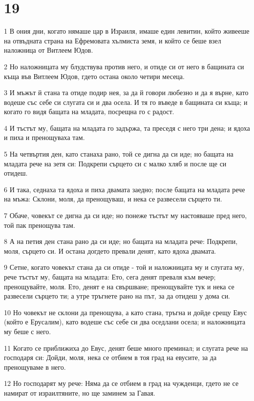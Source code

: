 \chapter{19}

\par 1 В ония дни, когато нямаше цар в Израиля, имаше един левитин, който живееше на отвъдната страна на Ефремовата хълмиста земя, и който се беше взел наложница от Витлеем Юдов.
\par 2 Но наложницата му блудствува против него, и отиде си от него в бащината си къща във Витлеем Юдов, гдето остана около четири месеца.
\par 3 И мъжът й стана та отиде подир нея, за да й говори любезно и да я върне, като водеше със себе си слугата си и два осела. И тя го въведе в бащината си къща; и когато го видя бащата на младата, посрещна го с радост.
\par 4 И тъстът му, бащата на младата го задържа, та преседя с него три дена; и ядоха и пиха и пренощуваха там.
\par 5 На четвъртия ден, като станаха рано, той се дигна да си иде; но бащата на младата рече на зетя си: Подкрепи сърцето си с малко хляб и после ще си отидеш.
\par 6 И така, седнаха та ядоха и пиха двамата заедно; после бащата на младата рече на мъжа: Склони, моля, да пренощуваш, и нека се развесели сърцето ти.
\par 7 Обаче, човекът се дигна да си иде; но понеже тъстът му настояваше пред него, той пак пренощува там.
\par 8 А на петия ден стана рано да си иде; но бащата на младата рече: Подкрепи, моля, сърцето си. И остана догдето превали денят, като ядоха двамата.
\par 9 Сетне, когато човекът стана да си отиде - той и наложницата му и слугата му, рече тъстът му, бащата на младата: Ето, сега денят преваля към вечер; пренощувайте, моля. Ето, денят е на свършване; пренощувайте тук и нека се развесели сърцето ти; а утре тръгнете рано на път, за да отидеш у дома си.
\par 10 Но човекът не склони да пренощува, а като стана, тръгна и дойде срещу Евус (който е Ерусалим), като водеше със себе си два оседлани осела; и наложницата му беше с него.
\par 11 Когато се приближиха до Евус, денят беше много преминал; и слугата рече на господаря си: Дойди, моля, нека се отбием в тоя град на евусите, за да пренощуваме в него.
\par 12 Но господарят му рече: Няма да се отбием в град на чужденци, гдето не се намират от израилтяните, но ще заминем за Гавая.
